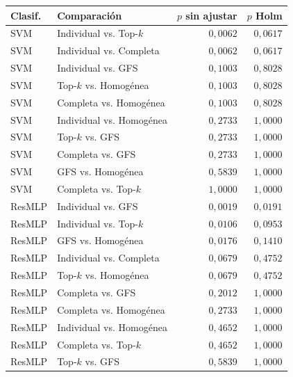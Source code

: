 \begin{resulttable}
\centering\fontsize{8}{10}\selectfont\setlength{\tabcolsep}{3.0pt}
\caption{Comparaciones por pares basadas en rangos de Friedman. Holm corrige los diez pares dentro de cada clasificador.}
\label{tab:classifier-holm}
\begin{tabular}{@{}llrr@{}}
\toprule
Clasif. & Comparación & $p$ sin ajustar & $p$ Holm \\
\midrule
SVM & Individual vs. Top-$k$ & $0{,}0062$ & $0{,}0617$ \\
SVM & Individual vs. Completa & $0{,}0062$ & $0{,}0617$ \\
SVM & Individual vs. GFS & $0{,}1003$ & $0{,}8028$ \\
SVM & Top-$k$ vs. Homogénea & $0{,}1003$ & $0{,}8028$ \\
SVM & Completa vs. Homogénea & $0{,}1003$ & $0{,}8028$ \\
SVM & Individual vs. Homogénea & $0{,}2733$ & $1{,}0000$ \\
SVM & Top-$k$ vs. GFS & $0{,}2733$ & $1{,}0000$ \\
SVM & Completa vs. GFS & $0{,}2733$ & $1{,}0000$ \\
SVM & GFS vs. Homogénea & $0{,}5839$ & $1{,}0000$ \\
SVM & Completa vs. Top-$k$ & $1{,}0000$ & $1{,}0000$ \\
ResMLP & Individual vs. GFS & $0{,}0019$ & $0{,}0191$ \\
ResMLP & Individual vs. Top-$k$ & $0{,}0106$ & $0{,}0953$ \\
ResMLP & GFS vs. Homogénea & $0{,}0176$ & $0{,}1410$ \\
ResMLP & Individual vs. Completa & $0{,}0679$ & $0{,}4752$ \\
ResMLP & Top-$k$ vs. Homogénea & $0{,}0679$ & $0{,}4752$ \\
ResMLP & Completa vs. GFS & $0{,}2012$ & $1{,}0000$ \\
ResMLP & Completa vs. Homogénea & $0{,}2733$ & $1{,}0000$ \\
ResMLP & Individual vs. Homogénea & $0{,}4652$ & $1{,}0000$ \\
ResMLP & Completa vs. Top-$k$ & $0{,}4652$ & $1{,}0000$ \\
ResMLP & Top-$k$ vs. GFS & $0{,}5839$ & $1{,}0000$ \\
\bottomrule
\end{tabular}
\end{resulttable}
\FloatBarrier
